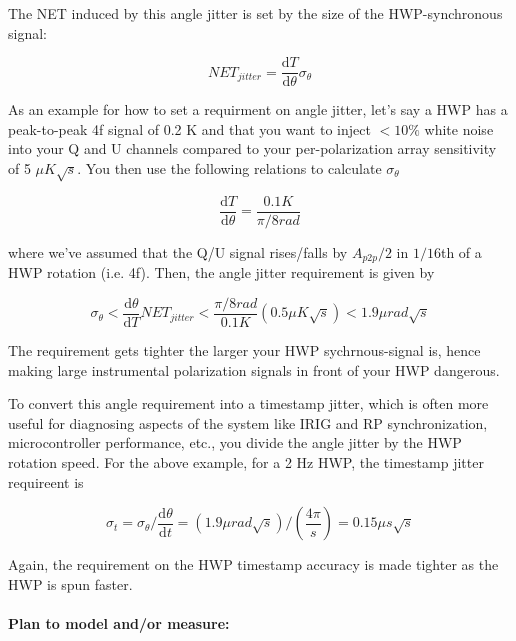 The NET induced by this angle jitter is set by the size of the HWP-synchronous signal:
 
 \begin{equation}
 	NET_{jitter} = \frac{\mathrm{d}T}{\mathrm{d}\theta} \sigma_{\theta} 
 \end{equation}

As an example for how to set a requirment on angle jitter, let's say a HWP has a peak-to-peak 4f signal of 0.2 K and that you want to inject $< 10 \%$ white noise into your Q and U channels compared to your per-polarization array sensitivity of 5 $\mu K \sqrt{s}$. You then use the following relations to calculate $\sigma_{\theta}$

\begin{equation}
	\frac{\mathrm{d}T}{\mathrm{d}\theta}  = \frac{0.1 K}{\pi/8 rad}
\end{equation}

where we've assumed that the Q/U signal rises/falls by $A_{p2p}/2$ in $1/16$th of a HWP rotation (i.e. 4f). Then, the angle jitter requirement is given by

\begin{equation}
    	\sigma_{\theta} < \frac{\mathrm{d}\theta}{\mathrm{d}T} NET_{jitter} <  \frac{\pi/8 rad}{0.1 K} (0.5 \mu K \sqrt{s}) < 1.9 \mu rad \sqrt{s}
\end{equation}

The requirement gets tighter the larger your HWP sychrnous-signal is, hence making large instrumental polarization signals in front of your HWP dangerous.

To convert this angle requirement into a timestamp jitter, which is often more useful for diagnosing aspects of the system like IRIG and RP synchronization, microcontroller performance, etc., you divide the angle jitter by the HWP rotation speed. For the above example, for a 2 Hz HWP, the timestamp jitter requireent is

\begin{equation}
	\sigma_{t} = \sigma_{\theta} / \frac{\mathrm{d}\theta}{\mathrm{d}{t}} = (1.9 \mu rad \sqrt{s}) / (\frac{4 \pi}{s}) = 0.15 \mu s \sqrt{s}
\end{equation}

Again, the requirement on the HWP timestamp accuracy is made tighter as the HWP is spun faster.
  
\paragraph{Plan to model and/or measure:}

